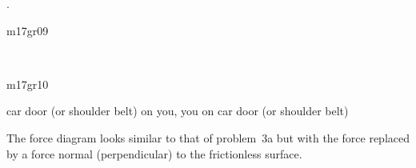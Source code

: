 {\begin{one-digit-list}
\TextAndFigure%
{\begin{one-digit-list}
 \item [d.] .
 \end{one-digit-list}%
}{m17gr09}
\bigskip

\TextAndFigure%
{\begin{one-digit-list}
 \item [e.] \ 
 \end{one-digit-list}%
}{m17gr10}
\medskip

\begin{one-digit-list}
  \item [f.] car door (or shoulder belt) on you, you on car door (or shoulder
            belt)
 \end{one-digit-list}
%
\item [5.] \NullItem
\begin{one-digit-list}
\item [a.] The force diagram looks similar to that of problem~3a but with
           the force \m{T} replaced by a force normal (perpendicular) to
           the frictionless surface.
\item [b.]  
\end{one-digit-list}
\end{one-digit-list}

}%